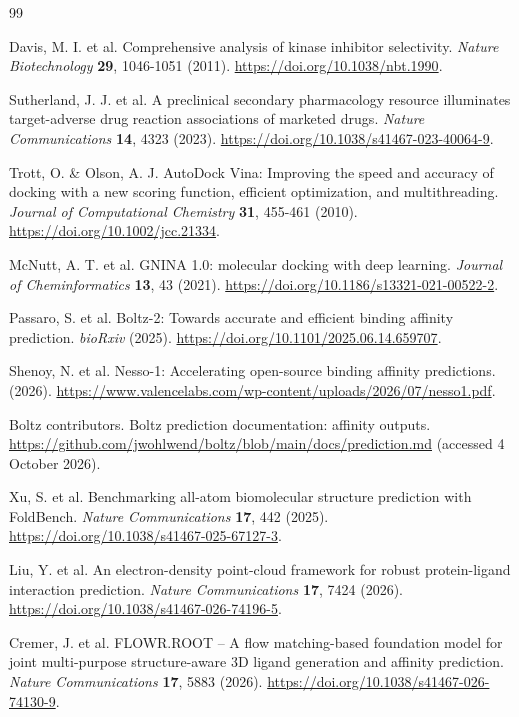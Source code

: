 \begin{thebibliography}{99}

 Davis, M. I. et al. Comprehensive analysis of kinase inhibitor selectivity. \textit{Nature Biotechnology} \textbf{29}, 1046-1051 (2011). \url{https://doi.org/10.1038/nbt.1990}.

 Sutherland, J. J. et al. A preclinical secondary pharmacology resource illuminates target-adverse drug reaction associations of marketed drugs. \textit{Nature Communications} \textbf{14}, 4323 (2023). \url{https://doi.org/10.1038/s41467-023-40064-9}.

 Trott, O. \& Olson, A. J. AutoDock Vina: Improving the speed and accuracy of docking with a new scoring function, efficient optimization, and multithreading. \textit{Journal of Computational Chemistry} \textbf{31}, 455-461 (2010). \url{https://doi.org/10.1002/jcc.21334}.

 McNutt, A. T. et al. GNINA 1.0: molecular docking with deep learning. \textit{Journal of Cheminformatics} \textbf{13}, 43 (2021). \url{https://doi.org/10.1186/s13321-021-00522-2}.

 Passaro, S. et al. Boltz-2: Towards accurate and efficient binding affinity prediction. \textit{bioRxiv} (2025). \url{https://doi.org/10.1101/2025.06.14.659707}.

 Shenoy, N. et al. Nesso-1: Accelerating open-source binding affinity predictions. (2026). \url{https://www.valencelabs.com/wp-content/uploads/2026/07/nesso1.pdf}.

 Boltz contributors. Boltz prediction documentation: affinity outputs. \url{https://github.com/jwohlwend/boltz/blob/main/docs/prediction.md} (accessed 4 October 2026).

 Xu, S. et al. Benchmarking all-atom biomolecular structure prediction with FoldBench. \textit{Nature Communications} \textbf{17}, 442 (2025). \url{https://doi.org/10.1038/s41467-025-67127-3}.

 Liu, Y. et al. An electron-density point-cloud framework for robust protein-ligand interaction prediction. \textit{Nature Communications} \textbf{17}, 7424 (2026). \url{https://doi.org/10.1038/s41467-026-74196-5}.

 Cremer, J. et al. FLOWR.ROOT -- A flow matching-based foundation model for joint multi-purpose structure-aware 3D ligand generation and affinity prediction. \textit{Nature Communications} \textbf{17}, 5883 (2026). \url{https://doi.org/10.1038/s41467-026-74130-9}.


\end{thebibliography}

